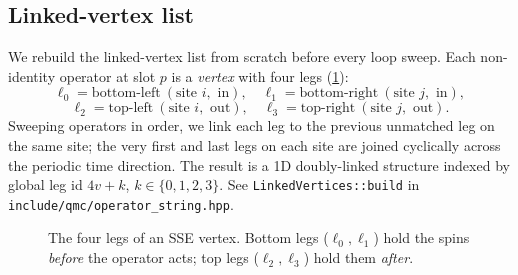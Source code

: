\documentclass[11pt,a4paper]{article}
\theoremstyle{definition}
\theoremstyle{plain}
\begin{document}
\subsection{Linked-vertex list}\label{sec:lvl}
We rebuild the linked-vertex list from scratch before every loop
sweep. Each non-identity operator at slot $p$ is a \emph{vertex} with
four legs (\cref{fig:vertex}):
\begin{equation*}
    \ell_0=\text{bottom-left}\ (\text{site }i,\text{ in}),\quad
    \ell_1=\text{bottom-right}\ (\text{site }j,\text{ in}),
\end{equation*}
\begin{equation*}
    \ell_2=\text{top-left}\ (\text{site }i,\text{ out}),\quad
    \ell_3=\text{top-right}\ (\text{site }j,\text{ out}).
\end{equation*}
Sweeping operators in order, we link each leg to the previous
unmatched leg on the same site; the very first and last legs on each
site are joined cyclically across the periodic time direction. The
result is a 1D doubly-linked structure indexed by global leg id
$4v + k$, $k\in\{0,1,2,3\}$. See
\lstinline|LinkedVertices::build| in
\texttt{include/qmc/operator\_string.hpp}.

\begin{figure}[ht]
\centering
{}
\caption{The four legs of an SSE vertex. Bottom legs ($\ell_0,\ell_1$)
hold the spins \emph{before} the operator acts; top legs
($\ell_2,\ell_3$) hold them \emph{after}.}
\label{fig:vertex}
\end{figure}
\end{document}
